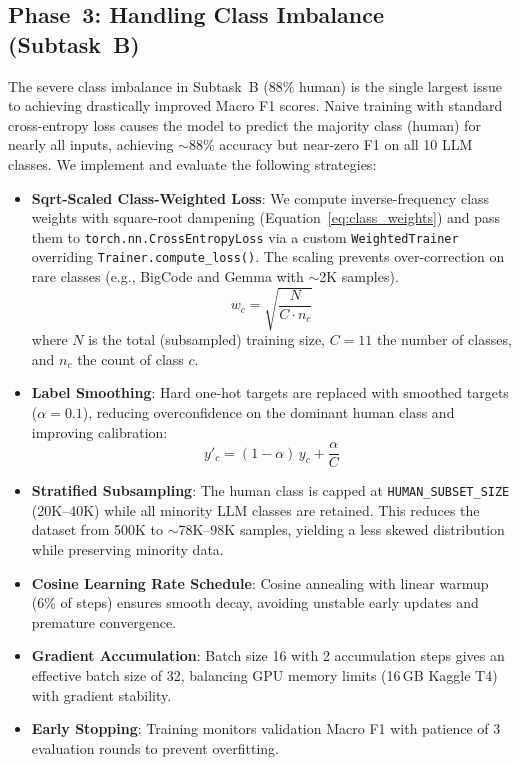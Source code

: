 \documentclass[11pt]{article}
\begin{document}
\subsection{Phase~3: Handling Class Imbalance (Subtask~B)}
\label{sec:imbalance}

The severe class imbalance in Subtask~B (88\% human) is the single largest issue to achieving drastically improved Macro F1 scores. Naive training with standard cross-entropy loss causes the model to predict the majority class (human) for nearly all inputs, achieving $\sim$88\% accuracy but near-zero F1 on all 10 LLM classes. We implement and evaluate the following strategies:

\begin{itemize}
    \item \textbf{Sqrt-Scaled Class-Weighted Loss}: We compute inverse-frequency class weights with square-root dampening (Equation~\ref{eq:class_weights}) and pass them to \texttt{torch.nn.CrossEntropyLoss} via a custom \texttt{WeightedTrainer} overriding \texttt{Trainer.compute\_loss()}. The scaling prevents over-correction on rare classes (e.g., BigCode and Gemma with $\sim$2K samples).
    \begin{equation}
    w_c = \sqrt{\frac{N}{C \cdot n_c}}
    \label{eq:class_weights}
    \end{equation}
    where $N$ is the total (subsampled) training size, $C=11$ the number of classes, and $n_c$ the count of class $c$.

    \item \textbf{Label Smoothing}: Hard one-hot targets are replaced with smoothed targets ($\alpha=0.1$), reducing overconfidence on the dominant human class and improving calibration:
    \begin{equation}
    y'_c = (1 - \alpha)\,y_c + \frac{\alpha}{C}
    \end{equation}

    \item \textbf{Stratified Subsampling}: The human class is capped at \texttt{HUMAN\_SUBSET\_SIZE} (20K--40K) while all minority LLM classes are retained. This reduces the dataset from 500K to $\sim$78K--98K samples, yielding a less skewed distribution while preserving minority data.

    \item \textbf{Cosine Learning Rate Schedule}: Cosine annealing with linear warmup (6\% of steps) ensures smooth decay, avoiding unstable early updates and premature convergence.

    \item \textbf{Gradient Accumulation}: Batch size 16 with 2 accumulation steps gives an effective batch size of 32, balancing GPU memory limits (16\,GB Kaggle T4) with gradient stability.

    \item \textbf{Early Stopping}: Training monitors validation Macro F1 with patience of 3 evaluation rounds to prevent overfitting.
\end{itemize}
\end{document}
